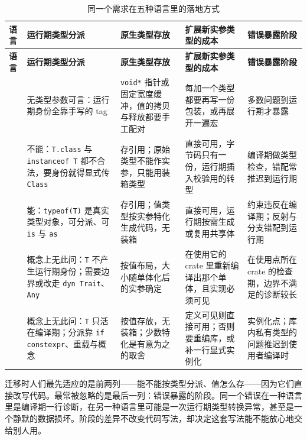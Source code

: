 \documentclass[12pt,a4paper,fontset=fandol]{ctexbook}
\newcommand{\cpplabel}{%
  \tcbox[on line,colback=cppheadbg,colframe=cppheadbg,
    boxrule=0pt,arc=1pt,left=2pt,right=2pt,top=1pt,bottom=1pt,
    colupper=white,fontupper=\scriptsize\bfseries]{C++}}
\newcommand{\clabel}{%
  \tcbox[on line,colback=cheadbg,colframe=cheadbg,
    boxrule=0pt,arc=1pt,left=2pt,right=2pt,top=1pt,bottom=1pt,
    colupper=white,fontupper=\scriptsize\bfseries]{C}}
\newcommand{\javalabel}{%
  \tcbox[on line,colback=javaheadbg,colframe=javaheadbg,
    boxrule=0pt,arc=1pt,left=2pt,right=2pt,top=1pt,bottom=1pt,
    colupper=white,fontupper=\scriptsize\bfseries]{Java}}
\newcommand{\csharplabel}{%
  \tcbox[on line,colback=csharpheadbg,colframe=csharpheadbg,
    boxrule=0pt,arc=1pt,left=2pt,right=2pt,top=1pt,bottom=1pt,
    colupper=white,fontupper=\scriptsize\bfseries]{C\#}}
\newcommand{\rustlabel}{%
  \tcbox[on line,colback=rustheadbg,colframe=rustheadbg,
    boxrule=0pt,arc=1pt,left=2pt,right=2pt,top=1pt,bottom=1pt,
    colupper=white,fontupper=\scriptsize\bfseries]{Rust}}
\newcommand{\kw}[1]{\texttt{#1}}
\begin{document}
\begin{longtable}{@{}>{\raggedright\arraybackslash}p{} >{\raggedright\arraybackslash}p{} >{\raggedright\arraybackslash}p{} >{\raggedright\arraybackslash}p{} >{\raggedright\arraybackslash}p{}@{}}
\caption{同一个需求在五种语言里的落地方式} \\
\toprule
\textbf{语言} & \textbf{运行期类型分派} & \textbf{原生类型存放} & \textbf{扩展新实参类型的成本} & \textbf{错误暴露阶段} \\
\midrule
\endfirsthead
\toprule
\textbf{语言} & \textbf{运行期类型分派} & \textbf{原生类型存放} & \textbf{扩展新实参类型的成本} & \textbf{错误暴露阶段} \\
\midrule
\endhead
\clabel & 无类型参数可言：运行期身份全靠手写的 tag & \kw{void*} 指针或固定宽度缓冲，值的拷贝与释放都要手工配对 & 每加一个类型都要再写一份包装，或再展开一遍宏 & 多数问题到运行期才暴露 \\
\addlinespace
\javalabel & 不能：\kw{T.class} 与 \kw{instanceof T} 都不合法，要身份就得显式传 \kw{Class} & 存引用；原始类型不能作实参，只能用装箱类型 & 直接可用，字节码只有一份，运行期插入校验用的转型 & 编译期做类型检查，错配常推迟到运行期 \\
\addlinespace
\csharplabel & 能：\kw{typeof(T)} 是真实类型对象，可分派、可 \kw{is} 与 \kw{as} & 存引用；值类型按实参特化生成代码，无装箱 & 直接可用，运行期按需生成或复用共享体 & 约束违反在编译期；反射与分支错配到运行期 \\
\addlinespace
\rustlabel & 概念上无此问：\kw{T} 不产生运行期身份；需要边界或改走 \kw{dyn Trait}、\kw{Any} & 按值布局，大小随单体化后的实参确定 & 在使用它的 crate 里重新编译出那个单体，且实现必须可见 & 在使用点所在 crate 的检查期，边界不满足的诊断较长 \\
\addlinespace
\cpplabel & 概念上无此问：\kw{T} 只活在编译期；分派靠 \kw{if constexpr}、重载与概念 & 按值存放，无装箱；少数特化是有意为之的取舍 & 定义可见则直接可用；否则要重编库，或补一行显式实例化 & 实例化点；库内私有类型的问题推迟到使用者编译时 \\
\bottomrule
\end{longtable}

\begin{note}[title={最容易被忽略的那一列}]
迁移时人们最先适应的是前两列——能不能按类型分派、值怎么存——因为它们直接改写代码。最常被忽略的是最后一列：错误暴露的阶段。同一个错误在一种语言里是编译期一行诊断，在另一种语言里可能是一次运行期类型转换异常，甚至是一个静默的数据损坏。阶段的差异不改变代码写法，却决定这套写法能不能放心地交给别人用。
\end{note}
\end{document}
